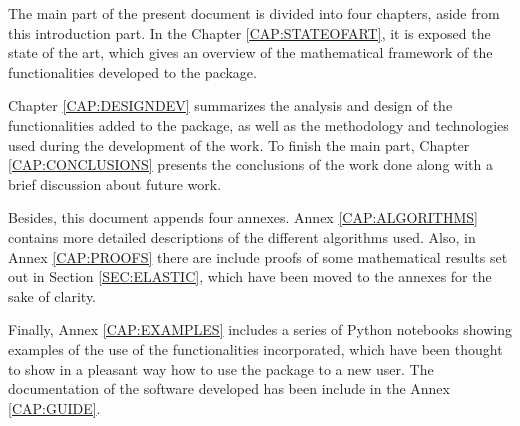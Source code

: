 The main part of the present document is divided into four chapters, aside from 
this introduction part. In the Chapter \ref{CAP:STATEOFART}, it is exposed the
state of the art, which gives an overview of the mathematical framework of the
functionalities developed to the package.

Chapter \ref{CAP:DESIGNDEV} summarizes the analysis and design of the
functionalities added to the package, as well as the methodology and
technologies used during the development of the work. To finish the main part,
Chapter \ref{CAP:CONCLUSIONS} presents the conclusions of the work done along
with a brief discussion about future work.

Besides, this document appends four annexes. Annex \ref{CAP:ALGORITHMS} contains
more detailed descriptions of the different algorithms used. Also, in Annex
\ref{CAP:PROOFS} there are include proofs of some mathematical results set out
in Section \ref{SEC:ELASTIC}, which have been moved to the annexes for the
sake of clarity.

Finally, Annex \ref{CAP:EXAMPLES} includes a series of Python notebooks showing
examples of the use of the functionalities incorporated, which have been thought
to show in a pleasant way how to use the package to a new user. The
documentation of the software developed has been include in the
Annex \ref{CAP:GUIDE}.
